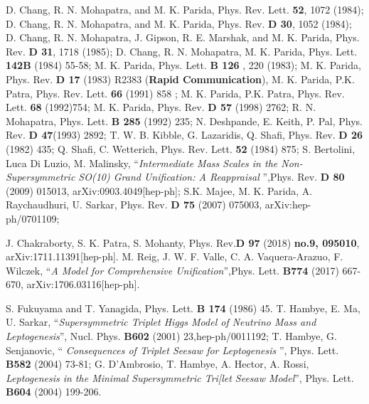 \documentclass[a4paper,11pt]{article}
\begin{document}
\begin{thebibliography}{99}
D. Chang, R. N. Mohapatra, and M. K. Parida, Phys. Rev. Lett.
 {\bf 52}, 1072 (1984);
  D. Chang, R. N. Mohapatra, and M. K. Parida,
 Phys. Rev. {\bf D 30}, 1052 (1984);
 D. Chang, R. N. Mohapatra, J. Gipson, R. E. Marshak,
  and M. K. Parida, Phys. Rev. {\bf D 31}, 1718 (1985);
 D. Chang, R. N. Mohapatra, M. K. Parida,  Phys. Lett. {\bf 142B} (1984) 55-58;
M. K. Parida, Phys. Lett. {\bf B 126 }, 220
  (1983); M. K. Parida, Phys. Rev. {\bf D 17} (1983) R2383 ({\bf Rapid Communication}),
M. K. Parida, P.K. Patra, Phys. Rev. Lett. {\bf 66} (1991) 858 ;
M. K. Parida, P.K. Patra, Phys. Rev. Lett. {\bf 68} (1992)754;
M. K. Parida, Phys. Rev. {\bf D 57} (1998) 2762; 
R. N. Mohapatra, Phys. Lett. {\bf B 285} (1992) 235;
 N. Deshpande, E. Keith, P. Pal, Phys. Rev. {\bf D 47}(1993) 2892;
T. W. B. Kibble, G. Lazaridis, Q. Shafi, Phys. Rev. {\bf D 26 } (1982)
435;
 Q. Shafi, C. Wetterich, Phys. Rev. Lett. {\bf 52} (1984) 875;
 S. Bertolini, Luca Di Luzio, M. Malinsky, ``{\em Intermediate Mass Scales in the Non-Supersymmetric SO(10) Grand Unification: A Reappraisal }'',Phys. Rev. {\bf D 80} (2009) 015013, arXiv:0903.4049[hep-ph];
S.K. Majee, M. K. Parida,
  A. Raychaudhuri, U. Sarkar, Phys. Rev. {\bf D 75 } (2007) 075003, arXiv:hep-ph/0701109;

J. Chakraborty, S. K. Patra, S. Mohanty, Phys. Rev.{\bf D 97} (2018)
{\bf no.9, 095010}, arXiv:1711.11391[hep-ph].
 M. Reig, J. W. F. Valle, C. A. Vaquera-Arazuo,
  F. Wilczek, ``{\em A Model for Comprehensive Unification}'',Phys. Lett. {\bf B774 } (2017) 667-670, arXiv:1706.03116[hep-ph].

 S. Fukuyama and T. Yanagida, Phys. Lett. {\bf
  B 174} (1986) 45.
 T. Hambye, E. Ma, U. Sarkar, ``{\em Supersymmetric
  Triplet Higgs Model of Neutrino Mass and Leptogenesis}'',
  Nucl. Phys. {\bf B602} (2001) 23,hep-ph/0011192; 
T. Hambye, G. Senjanovic, ``{ \em Consequences of
  Triplet Seesaw for Leptogenesis }'', Phys. Lett. {\bf B582} (2004)
73-81; G. D'Ambrosio, T. Hambye, A. Hector, A. Rossi, {\em
  Leptogenesis in the Minimal Supersymmetric Tri[let Seesaw Model}'',
  Phys. Lett. {\bf B604} (2004) 199-206.     


\end{thebibliography}
\end{document}
